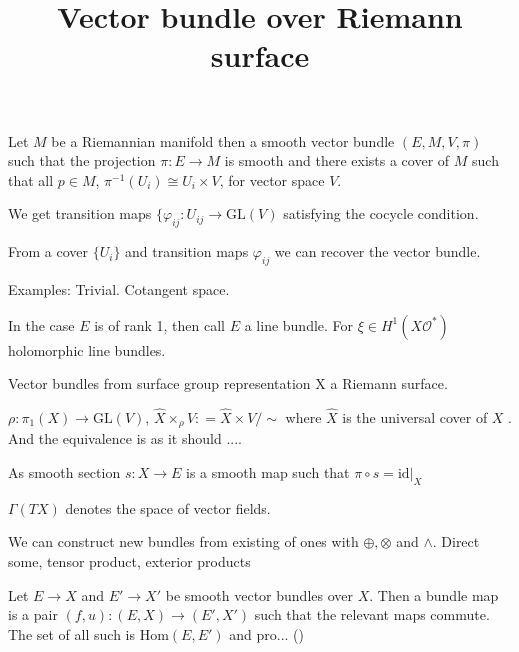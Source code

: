 % 

\title{Vector bundle over Riemann surface}
\author{}
\date{}

 
\maketitle

\begin{definition}
    Let $M$ be a Riemannian manifold 
    then a smooth vector bundle $(E, M, V, \pi) $ such that the projection 
    $ \pi : E \rightarrow  M $ is smooth and 
    there exists a cover of $M$ such that all $ p \in M $, $ \pi^{-1} (U_i) \cong U_i \times V $, for vector space $V$. 
\end{definition}

We get transition maps $ \{ \varphi_{ij} : U_{ij} \rightarrow  \mathrm{GL} ( V) $ satisfying the cocycle condition.

From a cover $\{U_i \} $ and transition maps $ \varphi _{ij} $ we can recover the vector bundle. 

Examples: 
Trivial. 
Cotangent space. 

In the case $ E$ is of rank 1, then call $E$ a line bundle. 
For $ \xi \in H^1( X \mathcal{O} ^* ) $ holomorphic line bundles. 

Vector bundles from surface group representation 
X a Riemann surface. 

$\rho : \pi_1 ( X) \rightarrow  \mathrm{GL} (V) $, 
$ \hat{X} \times _\rho V : = \hat{X} \times V / \sim $
where $ \hat{X} $ is the universal cover of $ X $ .
And the equivalence is as it should ....


\begin{definition}
 As smooth section $ s: X \rightarrow  E $ is a smooth map such that $ \pi \circ s  = \mathrm{id} | _ X $ 
\end{definition}

$\Gamma ( TX) $ denotes the space of vector fields.

We can construct new bundles from existing of ones with $ \oplus, \otimes$ and $ \wedge $. 
Direct some, tensor product, exterior products 

\begin{definition}
    Let $E \rightarrow X $ and $ E' \rightarrow  X' $ be smooth vector bundles over $ X$. 
    Then a bundle map is a pair $(f,u) : (E,X) \rightarrow  ( E', X') $ such that the relevant maps commute. 
    The set of all such is $\mathrm{Hom}(E, E') $ and pro... () 
\end{definition}

